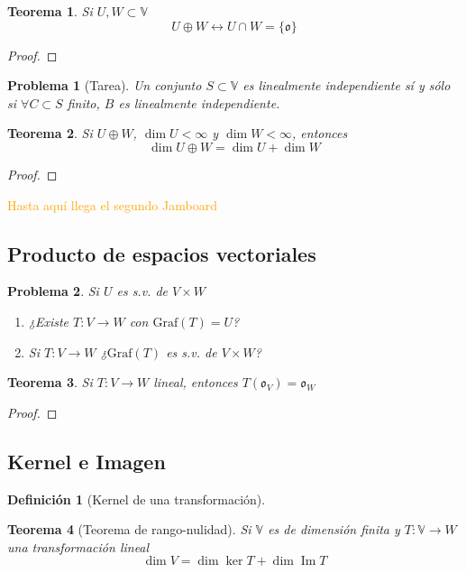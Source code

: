 \documentclass[14pt]{extarticle} %
\newtheorem{definicion}{Definición}
\newtheorem{teorema}{Teorema}
\theoremstyle{problemastyle} %
\newtheorem{problema}{Problema}
\newcommand{\cero}{\mathfrak{o}} %
\newcommand{\evV}{\mathbb{V}} %
\DeclareMathOperator{\im}{Im}
\begin{document}
\begin{teorema}
\label{sumdir sii cap cero}
    Si $U,W \subset \evV$
    $$U \oplus W \leftrightarrow U \cap W = \{\cero\}$$
\end{teorema}
\begin{proof}
    \todo{}
\end{proof}

\begin{problema}[Tarea]
    Un conjunto $S\subset \evV$ es linealmente independiente sí y sólo si $\forall C \subset S$ finito, $B$ es linealmente independiente.
\end{problema}

\begin{teorema}
    Si $U \oplus W$, $\dim U < \infty$ y  $\dim W < \infty$, entonces
    $$\dim U \oplus W = \dim U + \dim W$$
\end{teorema}
\begin{proof}
    \todo{}
\end{proof}

\textcolor{orange}{Hasta aquí llega el segundo Jamboard}

\subsection{Producto de espacios vectoriales}
\begin{problema}
    Si $U$ es s.v. de $V \times W$
    \begin{enumerate}
        \item ¿Existe $T:V \longrightarrow W $ con $\text{Graf}(T)=U$?
        \item Si $T:V \longrightarrow W $ ¿$\text{Graf}(T)$ es s.v. de $V\times W$?
    \end{enumerate}
\end{problema}

\begin{teorema}
    Si $T:V\longrightarrow W$ lineal, entonces $T(\cero_V)=\cero_W$
\end{teorema}
\begin{proof}
    \todo{}
\end{proof}

\subsection{Kernel e Imagen}
\begin{definicion}[Kernel de una transformación]

\end{definicion}
\begin{teorema}[Teorema de rango-nulidad]
\label{rango-nulidad}
    Si $\evV$ es de dimensión finita y $T: \evV \longrightarrow W$ una transformación lineal
    $$\dim V = \dim \ker T + \dim  \im T$$
\end{teorema}
\end{document}
